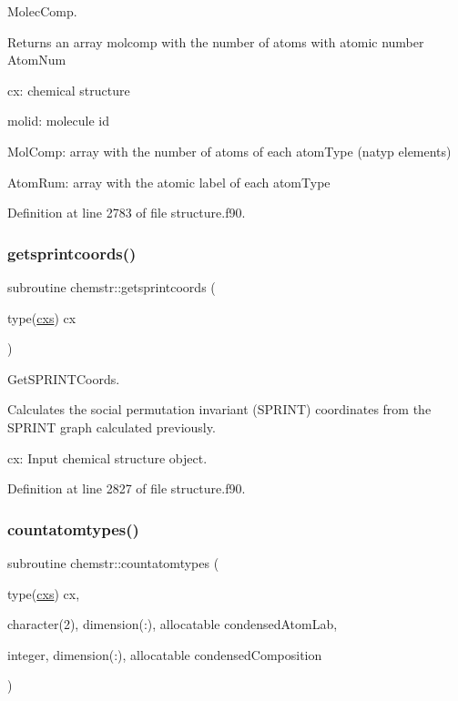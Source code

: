 Molec\+Comp. 

Returns an array molcomp with the number of atoms with atomic number Atom\+Num


\begin{DoxyItemize}
\item cx\+: chemical structure
\item molid\+: molecule id
\item Mol\+Comp\+: array with the number of atoms of each atom\+Type (natyp elements)
\item Atom\+Rum\+: array with the atomic label of each atom\+Type 
\end{DoxyItemize}

Definition at line 2783 of file structure.\+f90.

\mbox{\label{namespacechemstr_a0d2a715a7be719b13cca90019bdf542d}} 
\subsubsection{\texorpdfstring{getsprintcoords()}{getsprintcoords()}}
{\footnotesize\ttfamily subroutine chemstr\+::getsprintcoords (\begin{DoxyParamCaption}\item[{type(\mbox{\hyperlink{structchemstr_1_1cxs}{cxs}})}]{cx }\end{DoxyParamCaption})}



Get\+S\+P\+R\+I\+N\+T\+Coords. 

Calculates the social permutation invariant (S\+P\+R\+I\+NT) coordinates from the S\+P\+R\+I\+NT graph calculated previously.


\begin{DoxyItemize}
\item cx\+: Input chemical structure object. 
\end{DoxyItemize}

Definition at line 2827 of file structure.\+f90.

\mbox{\label{namespacechemstr_a6e02c23c18928196e92a1cdded34c7a7}} 
\subsubsection{\texorpdfstring{countatomtypes()}{countatomtypes()}}
{\footnotesize\ttfamily subroutine chemstr\+::countatomtypes (\begin{DoxyParamCaption}\item[{type(\mbox{\hyperlink{structchemstr_1_1cxs}{cxs}})}]{cx,  }\item[{character(2), dimension(\+:), allocatable}]{condensed\+Atom\+Lab,  }\item[{integer, dimension(\+:), allocatable}]{condensed\+Composition }\end{DoxyParamCaption})}



